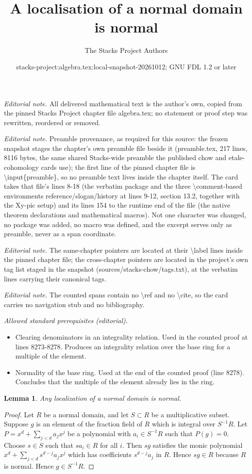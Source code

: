 \documentclass[10pt,a4paper]{amsart}
\title{A localisation of a normal domain is normal}
\author{The Stacks Project Authors}
\date{stacks-project:algebra.tex:local-snapshot-20261012; GNU FDL 1.2 or later}
\theoremstyle{plain}
\newtheorem{lemma}[subsection]{Lemma}
\theoremstyle{definition}
\theoremstyle{remark}
\numberwithin{equation}{subsection}
\begin{document}
\maketitle
\noindent\textit{Editorial note.} All delivered mathematical text is the author's own, copied from the pinned Stacks Project chapter file algebra.tex; no statement or proof step was rewritten, reordered or removed.\par\medskip
\noindent\textit{Editorial note.} Preamble provenance, as required for this source: the frozen snapshot stages the chapter's own preamble file beside it (preamble.tex, 217 lines, 8116 bytes, the same shared Stacks-wide preamble the published chow and etale-cohomology cards use); the first line of the pinned chapter file is \textbackslash{}input\{preamble\}, so no preamble text lives inside the chapter itself. The card takes that file's lines 8-18 (the verbatim package and the three \textbackslash{}comment-based environments reference/slogan/history at lines 9-12, section 13.2, together with the Xy-pic setup) and its lines 154 to the runtime end of the file (the native theorem declarations and mathematical macros). Not one character was changed, no package was added, no macro was defined, and the excerpt serves only as preamble, never as a span coordinate.\par\medskip
\noindent\textit{Editorial note.} The same-chapter pointers are located at their \textbackslash{}label lines inside the pinned chapter file; the cross-chapter pointers are located in the project's own tag list staged in the snapshot (sources/stacks-chow/tags.txt), at the verbatim lines carrying their canonical tags.\par\medskip
\noindent\textit{Editorial note.} The counted spans contain no \textbackslash{}ref and no \textbackslash{}cite, so the card carries no navigation stub and no bibliography.\par\medskip
\noindent\textit{Allowed standard prerequisites (editorial).}\begin{itemize}
\item Clearing denominators in an integrality relation. Used in the counted proof at lines 8273-8278. Produces an integrality relation over the base ring for a multiple of the element.
\item Normality of the base ring. Used at the end of the counted proof (line 8278). Concludes that the multiple of the element already lies in the ring.
\end{itemize}\medskip
\begin{lemma}
\label{lemma-localize-normal-domain}
Any localization of a normal domain is normal.
\end{lemma}

\begin{proof}
Let $R$ be a normal domain, and let $S \subset R$ be
a multiplicative subset. Suppose $g$ is an element
of the fraction field of $R$ which is integral over $S^{-1}R$.
Let $P = x^d + \sum_{j < d} a_j x^j$ be a polynomial
with $a_i \in S^{-1}R$ such that $P(g) = 0$.
Choose $s \in S$ such that $sa_i \in R$ for all $i$.
Then $sg$ satisfies the monic polynomial
$x^d + \sum_{j < d} s^{d-j}a_j x^j$ which has coefficients
$s^{d-j}a_j$ in $R$. Hence $sg \in R$ because $R$ is normal.
Hence $g \in S^{-1}R$.
\end{proof}
\end{document}
